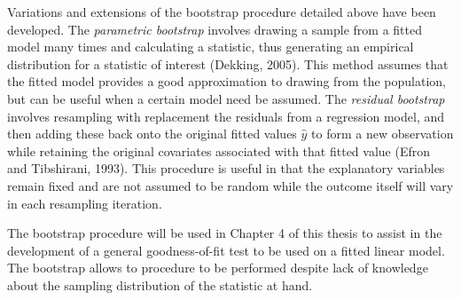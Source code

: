 		Variations and extensions of the bootstrap procedure detailed above have been developed. The \textit{parametric bootstrap} involves drawing a sample from a fitted model many times and calculating
		a statistic, thus generating an empirical distribution for a statistic of interest (Dekking, 2005). This method assumes that the fitted model provides a good approximation to drawing from the
		population, but can be useful when a certain model need be assumed. The \textit{residual bootstrap} involves resampling with replacement the residuals from a regression model, and then adding
		these back onto the original fitted values $\hat{y}$ to form a new observation while retaining the original covariates associated with that fitted value (Efron and Tibshirani, 1993). This procedure
		is useful in that the explanatory variables remain fixed and are not assumed to be random while the outcome itself will vary in each resampling iteration.

		The bootstrap procedure will be used in Chapter 4 of this thesis to assist in the development of a general goodness-of-fit test to be used on a fitted linear model. The bootstrap allows to procedure
		to be performed despite lack of knowledge about the sampling distribution of the statistic at hand.



		